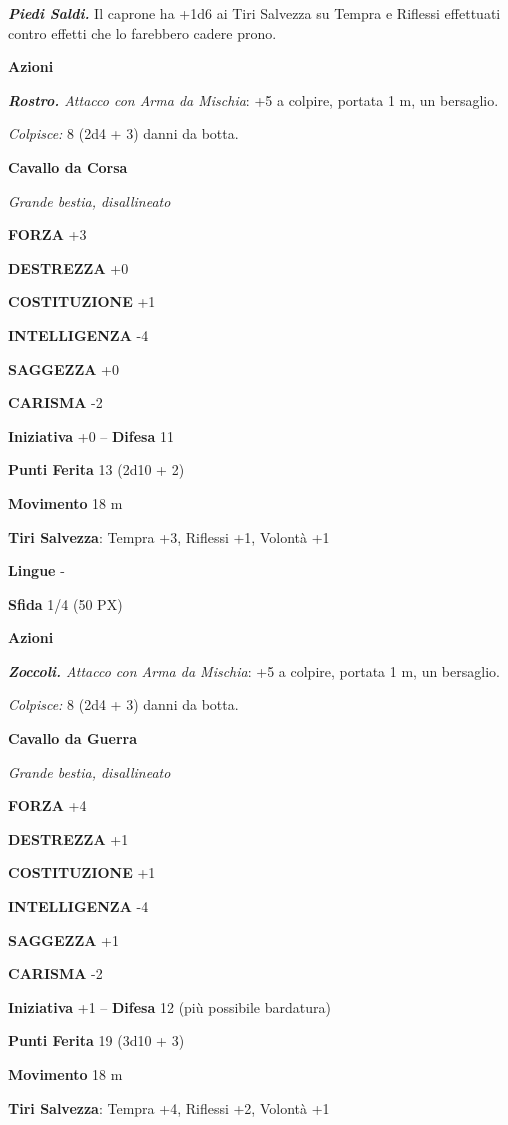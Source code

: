 \begin{multicols}{2}
\textit{\textbf{Piedi Saldi.}} Il caprone ha +1d6 ai Tiri Salvezza su Tempra e Riflessi effettuati contro effetti che lo farebbero cadere prono.

\textbf{Azioni}

\textit{\textbf{Rostro.} Attacco con Arma da Mischia}: +5 a colpire, portata 1 m, un bersaglio.

\textit{Colpisce:} 8 (2d4 + 3) danni da botta.

\medskip\textbf{Cavallo da Corsa}

\textit{Grande bestia, disallineato}

\textbf{FORZA} +3

\textbf{DESTREZZA} +0

\textbf{COSTITUZIONE} +1

\textbf{INTELLIGENZA} -4

\textbf{SAGGEZZA} +0

\textbf{CARISMA} -2

\textbf{Iniziativa} +0 -- \textbf{Difesa} 11

\textbf{Punti Ferita} 13 (2d10 + 2)

\textbf{Movimento} 18 m

\textbf{Tiri Salvezza}: Tempra +3, Riflessi +1, Volontà +1

\textbf{Lingue} -

\textbf{Sfida} 1/4 (50 PX)

\textbf{Azioni}

\textit{\textbf{Zoccoli.} Attacco con Arma da Mischia}: +5 a colpire, portata 1 m, un bersaglio.

\textit{Colpisce:} 8 (2d4 + 3) danni da botta.

\medskip\textbf{Cavallo da Guerra}

\textit{Grande bestia, disallineato}

\textbf{FORZA} +4

\textbf{DESTREZZA} +1

\textbf{COSTITUZIONE} +1

\textbf{INTELLIGENZA} -4

\textbf{SAGGEZZA} +1

\textbf{CARISMA} -2

\textbf{Iniziativa} +1 -- \textbf{Difesa} 12 (più possibile bardatura)

\textbf{Punti Ferita} 19 (3d10 + 3)

\textbf{Movimento} 18 m

\textbf{Tiri Salvezza}: Tempra +4, Riflessi +2, Volontà +1


\end{multicols}
